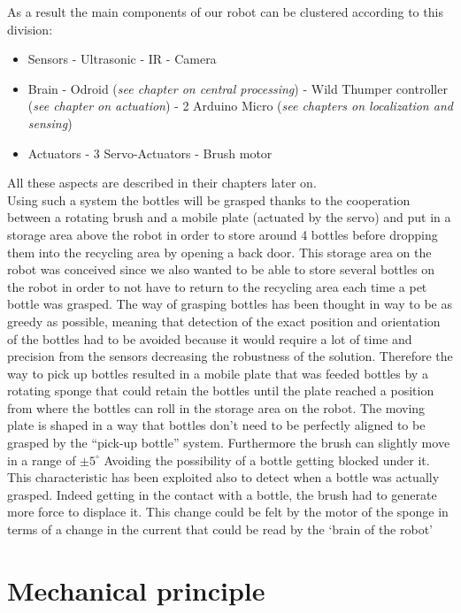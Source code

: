 As a result the main components of our robot can be clustered according to this division:
\begin{itemize}
\item Sensors
\subitem - Ultrasonic
\subitem  - IR
\subitem  - Camera
\item Brain
\subitem  - Odroid (\textit{see chapter on central processing})
\subitem  - Wild Thumper controller (\textit{see chapter on actuation})
\subitem  - 2 Arduino Micro (\textit{see chapters on localization and sensing})
\item Actuators
\subitem  - 3 Servo-Actuators
\subitem  - Brush motor
\end{itemize}

All these aspects are described in their chapters later on.\\

Using such a system the bottles will be grasped thanks to the cooperation between a rotating brush and a mobile plate (actuated by the servo) and put in a storage area above the robot in order to store  around 4 bottles before dropping them into the recycling area by opening a back door.
This storage area on the robot was conceived since we also wanted to be able to store several bottles on the robot in order to not have to return to the recycling area each time a pet bottle was grasped.
The way of grasping bottles has been thought in way to be as greedy as possible, meaning that detection of the exact position and orientation of the bottles had to be avoided because it would require a lot of time and precision from the sensors decreasing the robustness of the solution.
Therefore the way to pick up bottles resulted in a mobile plate that was feeded bottles by a rotating  sponge that could retain the bottles until the  plate reached a position from where the bottles can roll in the storage area on the robot.
The moving plate is shaped in a way that bottles don’t need to be perfectly aligned  to be grasped by the “pick-up bottle” system. Furthermore the brush can slightly move in a range of $\pm 5^{\circ}$ Avoiding the possibility of a bottle getting blocked under it.
 This characteristic has been exploited also to detect when a bottle was actually grasped. Indeed getting in the contact with a bottle, the brush had to generate more force to displace it. This change could be felt by the motor of the sponge in terms of a change in the current that could be read by the `brain of the robot'

\section{Mechanical principle}

